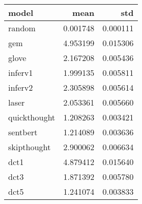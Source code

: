 \begin{tabular}{lrr}
\toprule
        model &      mean &       std \\
\midrule
       random &  0.001748 &  0.000111 \\
          gem &  4.953199 &  0.015306 \\
        glove &  2.167208 &  0.005436 \\
      inferv1 &  1.999135 &  0.005811 \\
      inferv2 &  2.305898 &  0.005614 \\
        laser &  2.053361 &  0.005660 \\
 quickthought &  1.208263 &  0.003421 \\
     sentbert &  1.214089 &  0.003636 \\
  skipthought &  2.900062 &  0.006634 \\
         dct1 &  4.879412 &  0.015640 \\
         dct3 &  1.871392 &  0.005780 \\
         dct5 &  1.241074 &  0.003833 \\
\bottomrule
\end{tabular}
